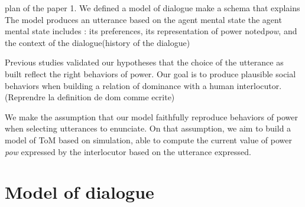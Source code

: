 \documentclass{llncs}
\begin{document}
	plan of the paper
	1. We defined a model of dialogue make a schema that explains 
	The model produces an utterance based on the agent mental state
	the agent mental state includes : its preferences, its representation of power noted\emph{pow}, and the context of the dialogue(history of the dialogue)
	
	Previous studies validated our hypotheses that the choice of the utterance as built reflect the right behaviors of power.
	Our goal is to produce plausible social behaviors when building a relation of dominance with a human interlocutor. 
	(Reprendre la definition de dom comme ecrite) 
	
	We make the assumption that our model faithfully reproduce behaviors of power when selecting utterances to enunciate. On that assumption, we aim to build a model of ToM based on simulation, able to compute the current value of power \emph{pow} expressed by the interlocutor based on the utterance expressed. 
	
	\section{Model of dialogue}
	
\end{document}
